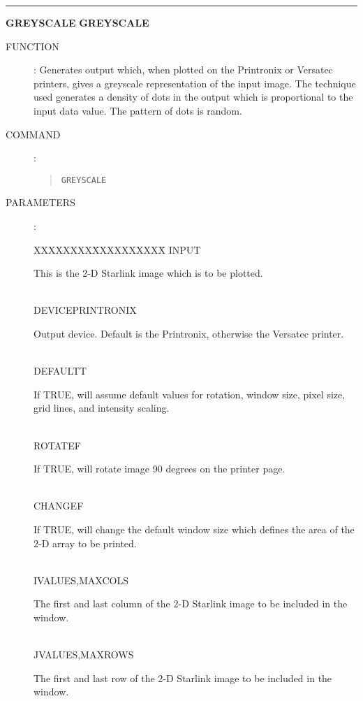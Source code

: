 \goodbreak
\rule{\textwidth}{0.3mm}
{\Large {\bf GREYSCALE} \hfill {\bf GREYSCALE}}
\begin{description}
\item [FUNCTION]:
Generates output which, when plotted on the Printronix or Versatec printers,
gives a greyscale representation of the input image.
The technique used generates a density of dots in the output which is
proportional to the input data value.
The pattern of dots is random.
\item [COMMAND]:
\begin{quote}
{\tt GREYSCALE}
\end{quote}
\item [PARAMETERS] :
\begin{tabbing}
XXXXXXXX\=XXXXXXXXXX\=\kill
INPUT\>\>\begin{minipage}[t]{100mm}
This is the 2-D Starlink image which is to be plotted.
\end{minipage}\\
DEVICE\>PRINTRONIX\>\begin{minipage}[t]{100mm}
Output device.
Default is the Printronix, otherwise the Versatec printer.
\end{minipage}\\
DEFAULT\>T\>\begin{minipage}[t]{100mm}
If TRUE, will assume default values for rotation, window size, pixel size,
grid lines, and intensity scaling.
\end{minipage}\\
ROTATE\>F\>\begin{minipage}[t]{100mm}
If TRUE, will rotate image 90 degrees on the printer page.
\end{minipage}\\
CHANGE\>F\>\begin{minipage}[t]{100mm}
If TRUE, will change the default window size which defines the area of the 2-D
array to be printed.
\end{minipage}\\
IVALUES,MAXCOLS\>\begin{minipage}[t]{100mm}
The first and last column of the 2-D Starlink image to be included in the
window.
\end{minipage}\\
JVALUES,MAXROWS\>\begin{minipage}[t]{100mm}
The first and last row of the 2-D Starlink image to be included in the window.
\end{minipage}\\

\end{tabbing}
\end{description}
